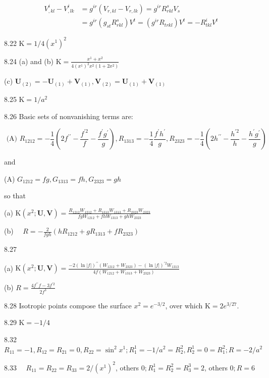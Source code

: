 \documentclass[10pt]{article}
\begin{document}
$$
\begin{aligned}
V_{, k l}^{i}-V_{, l k}^{i} & =g^{i r}\left(V_{r, k l}-V_{r, l k}\right)=g^{i r} R_{r k l}^{s} V_{s} \\
& =g^{i r}\left(g_{s t} R_{r k l}^{s}\right) V^{t}=\left(g^{i r} R_{t r k l}\right) V^{t}=-R_{t k l}^{i} V^{t}
\end{aligned}
$$

8.22 $\mathrm{K}=1 / 4\left(x^{1}\right)^{2}$

8.24 (a) and (b) $\mathrm{K}=\frac{x^{1}+x^{2}}{4\left(x^{1}\right)^{2} x^{2}\left(1+2 x^{2}\right)}$

(c) $\mathbf{U}_{(2)}=-\mathbf{U}_{(1)}+\mathbf{V}_{(1)}, \mathbf{V}_{(2)}=\mathbf{U}_{(1)}+\mathbf{V}_{(1)}$

8.25 $\mathrm{K}=1 / a^{2}$

8.26 Basic sets of nonvanishing terms are:

$$
\text { (A) } R_{1212}=-\frac{1}{4}\left(2 f^{\prime \prime}-\frac{f^{\prime 2}}{f}-\frac{f^{\prime} g^{\prime}}{g}\right), R_{1313}=-\frac{1}{4} \frac{f^{\prime} h^{\prime}}{g}, R_{2323}=-\frac{1}{4}\left(2 h^{\prime \prime}-\frac{h^{\prime 2}}{h}-\frac{h^{\prime} g^{\prime}}{g}\right)
$$

and

(A) $G_{1212}=f g, G_{1313}=f h, G_{2323}=g h$

so that

(a) $\mathrm{K}\left(x^{2} ; \mathbf{U}, \mathbf{V}\right)=\frac{R_{1212} W_{1212}+R_{1313} W_{1313}+R_{2323} W_{2323}}{f g W_{1212}+f h W_{1313}+g h W_{2323}}$

(b) $\quad R=-\frac{2}{f g h}\left(h R_{1212}+g R_{1313}+f R_{2323}\right)$

8.27

(a) $\mathrm{K}\left(x^{2} ; \mathbf{U}, \mathbf{V}\right)=\frac{-2(\ln |f|)^{\prime \prime}\left(W_{1212}+W_{2323}\right)-(\ln |f|)^{\prime 2} W_{1313}}{4 f\left(W_{1212}+W_{1313}+W_{2323}\right)}$

(b) $R=\frac{4 f^{\prime \prime} f-3 f^{\prime 2}}{2 f^{3}}$

8.28 Isotropic points compose the surface $x^{2}=e^{-3 / 2}$, over which $\mathrm{K}=2 e^{3 / 27}$.

8.29 $\mathrm{K}=-1 / 4$

8.32 $R_{11}=-1, R_{12}=R_{21}=0, R_{22}=\sin ^{2} x^{1} ; R_{1}^{1}=-1 / a^{2}=R_{2}^{2}, R_{2}^{1}=0=R_{1}^{2} ; R=-2 / a^{2}$

8.33 $\quad R_{11}=R_{22}=R_{33}=2 /\left(x^{1}\right)^{2}$, others $0 ; R_{1}^{1}=R_{2}^{2}=R_{3}^{3}=2$, others $0 ; R=6$
\end{document}
